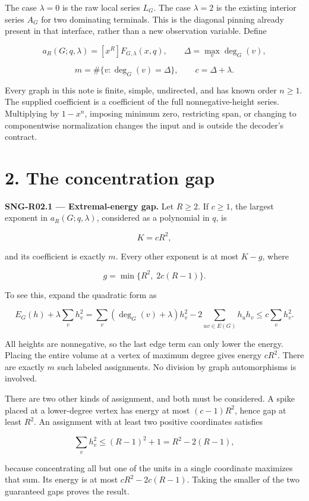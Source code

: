 \documentclass[
  11pt,
  a4paper,
]{report}
\begin{document}
The case \(\lambda=0\) is the raw local series \(L_G\). The case
\(\lambda=2\) is the existing interior series \(A_G\) for two dominating
terminals. This is the diagonal pinning already present in that
interface, rather than a new observation variable. Define

\[
a_R(G;q,\lambda)=[x^R]F_{G,\lambda}(x,q),
\qquad
\Delta=\max_v\deg_G(v),
\]

\[
m=\#\{v:\deg_G(v)=\Delta\},
\qquad c=\Delta+\lambda.
\]

Every graph in this note is finite, simple, undirected, and has known
order \(n\ge1\). The supplied coefficient is a coefficient of the full
nonnegative-height series. Multiplying by \(1-x^n\), imposing minimum
zero, restricting span, or changing to componentwise normalization
changes the input and is outside the decoder's contract.

\hypertarget{the-concentration-gap}{%
\section{2. The concentration gap}\label{the-concentration-gap}}

\textbf{SNG-R02.1 --- Extremal-energy gap.} Let \(R\ge2\). If \(c\ge1\),
the largest exponent in \(a_R(G;q,\lambda)\), considered as a polynomial
in \(q\), is

\[
K=cR^2,
\]

and its coefficient is exactly \(m\). Every other exponent is at most
\(K-g\), where

\[
\boxed{g=\min\{R^2,\;2c(R-1)\}.}
\]

To see this, expand the quadratic form as

\[
E_G(h)+\lambda\sum_vh_v^2
 =\sum_v(\deg_G(v)+\lambda)h_v^2
   -2\sum_{uv\in E(G)}h_uh_v
 \le c\sum_vh_v^2.
\]

All heights are nonnegative, so the last edge term can only lower the
energy. Placing the entire volume at a vertex of maximum degree gives
energy \(cR^2\). There are exactly \(m\) such labeled assignments. No
division by graph automorphisms is involved.

There are two other kinds of assignment, and both must be considered. A
spike placed at a lower-degree vertex has energy at most \((c-1)R^2\),
hence gap at least \(R^2\). An assignment with at least two positive
coordinates satisfies

\[
\sum_vh_v^2\le(R-1)^2+1
 =R^2-2(R-1),
\]

because concentrating all but one of the units in a single coordinate
maximizes that sum. Its energy is at most \(cR^2-2c(R-1)\). Taking the
smaller of the two guaranteed gaps proves the result.
\end{document}
